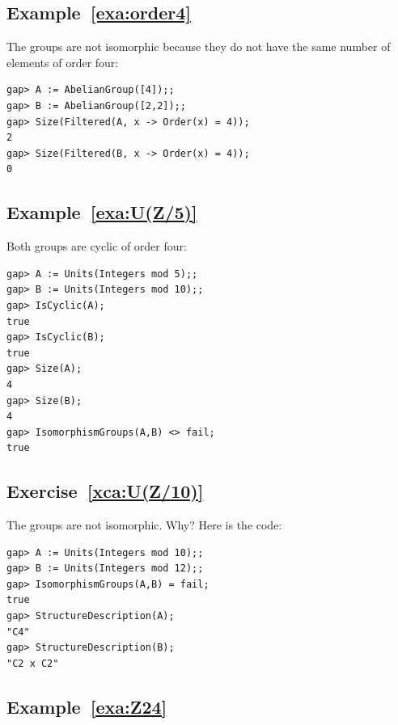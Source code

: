 \subsection*{Example~\ref{exa:order4}}

The groups are not isomorphic because
they do not have the same number of elements of order four:
\begin{lstlisting}
gap> A := AbelianGroup([4]);;
gap> B := AbelianGroup([2,2]);;
gap> Size(Filtered(A, x -> Order(x) = 4));
2
gap> Size(Filtered(B, x -> Order(x) = 4));
0
\end{lstlisting}

\subsection*{Example~\ref{exa:U(Z/5)}}

Both groups are cyclic of order four:
\begin{lstlisting}
gap> A := Units(Integers mod 5);;
gap> B := Units(Integers mod 10);;
gap> IsCyclic(A);
true
gap> IsCyclic(B);
true
gap> Size(A);
4
gap> Size(B);
4
gap> IsomorphismGroups(A,B) <> fail;
true
\end{lstlisting}

\subsection*{Exercise~\ref{xca:U(Z/10)}}

The groups are not isomorphic. Why?
Here is the code:
\begin{lstlisting}
gap> A := Units(Integers mod 10);;
gap> B := Units(Integers mod 12);;
gap> IsomorphismGroups(A,B) = fail;
true
gap> StructureDescription(A);
"C4"
gap> StructureDescription(B);
"C2 x C2"
\end{lstlisting}

\subsection*{Example~\ref{exa:Z24}}

